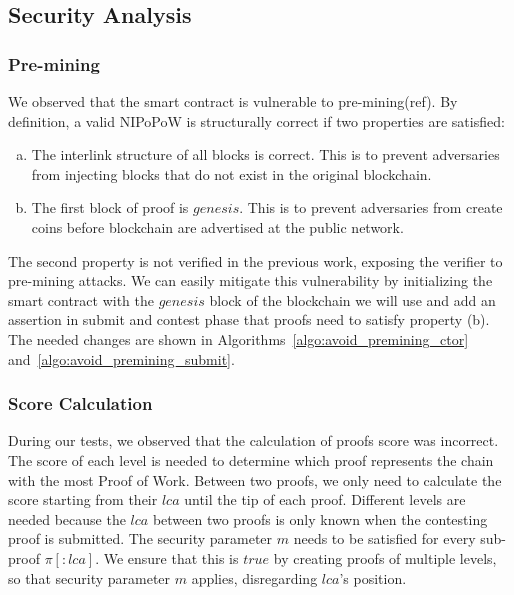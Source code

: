 

\subsection{Security Analysis}

\subsubsection{Pre-mining} We observed that the smart contract is vulnerable to
pre-mining(ref). By definition, a valid NIPoPoW is structurally correct if two
properties are satisfied:

\begin{enumerate}[(a)]

\item The interlink structure of all blocks is correct. This is to prevent
    adversaries from injecting blocks that do not exist in the original
    blockchain.

\item The first block of proof is $genesis$. This is to prevent adversaries
    from create coins before blockchain are advertised at the public network.

\end{enumerate}

The second property is not verified in the previous work, exposing the verifier
to pre-mining attacks. We can easily mitigate this vulnerability by
initializing the smart contract with the $genesis$ block of the blockchain we
will use and add an assertion in submit and contest phase that proofs need to
satisfy property (b). The needed changes are shown in
Algorithms~\ref{algo:avoid_premining_ctor}
and~\ref{algo:avoid_premining_submit}.



\subsubsection{Score Calculation}

During our tests, we observed that the calculation of proofs score was
incorrect. The score of each level is needed to determine which proof
represents the chain with the most Proof of Work. Between two proofs, we only
need to calculate the score starting from their $lca$ until the tip of each
proof. Different levels are needed because the $lca$ between two proofs is only
known when the contesting proof is submitted. The security parameter $m$ needs
to be satisfied for every sub-proof $\pi[:lca]$. We ensure that this is $true$
by creating proofs of multiple levels, so that security parameter $m$ applies,
disregarding $lca$'s position.

